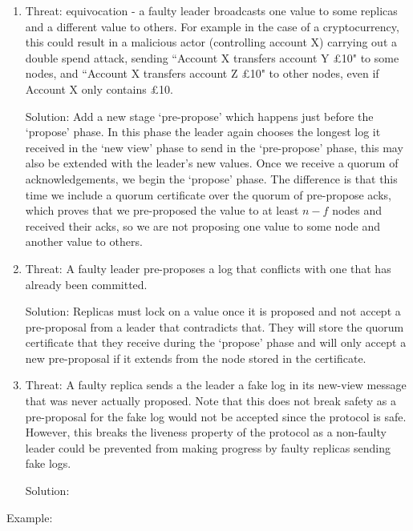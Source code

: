 \begin{enumerate}
\item Threat: equivocation - a faulty leader broadcasts one value to some replicas and a different value to others. For example in the case of a cryptocurrency, this could result in a malicious actor (controlling account X) carrying out a double spend attack, sending ``Account X transfers account Y £10" to some nodes, and ``Account X transfers account Z £10" to other nodes, even if Account X only contains £10.

Solution: Add a new stage `pre-propose' which happens just before the `propose' phase. In this phase the leader again chooses the longest log it received in the `new view' phase to send in the `pre-propose' phase, this may also be extended with the leader's new values. Once we receive a quorum of acknowledgements, we begin the `propose' phase. The difference is that this time we include a quorum certificate over the quorum of pre-propose acks, which proves that we pre-proposed the value to at least $n - f$ nodes and received their acks, so we are not proposing one value to some node and another value to others.

\item Threat: A faulty leader pre-proposes a log that conflicts with one that has already been committed.

Solution: Replicas must lock on a value once it is proposed and not accept a pre-proposal from a leader that contradicts that. They will store the quorum certificate that they receive during the `propose' phase and will only accept a new pre-proposal if it extends from the node stored in the certificate.

\item Threat: A faulty replica sends a the leader a fake log in its new-view message that was never actually proposed. Note that this does not break safety as a pre-proposal for the fake log would not be accepted since the protocol is safe. However, this breaks the liveness property of the protocol as a non-faulty leader could be prevented from making progress by faulty replicas sending fake logs.

Solution: 

\end{enumerate}

Example:

